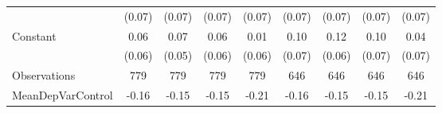 {\begin{tabular}{l*{8}{c}}
                    &      (0.07)         &      (0.07)         &      (0.07)         &      (0.07)         &      (0.07)         &      (0.07)         &      (0.07)         &      (0.07)         \\
[1em]
Constant            &        0.06         &        0.07         &        0.06         &        0.01         &        0.10         &        0.12\sym{**} &        0.10         &        0.04         \\
                    &      (0.06)         &      (0.05)         &      (0.06)         &      (0.06)         &      (0.07)         &      (0.06)         &      (0.07)         &      (0.07)         \\
\hline
Observations        &         779         &         779         &         779         &         779         &         646         &         646         &         646         &         646         \\
MeanDepVarControl   &       -0.16         &       -0.15         &       -0.15         &       -0.21         &       -0.16         &       -0.15         &       -0.15         &       -0.21         \\
\hline\hline
\end{tabular}
}

